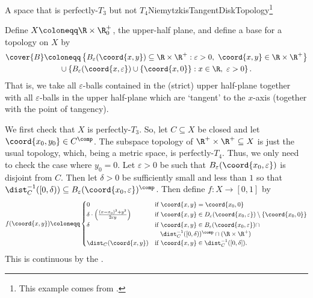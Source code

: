 \begin{exm}{A space that is perfectly-$T_3$ but not $T_4$}{NiemytzkisTangentDiskTopology}\footnote{This example comes from \cite[pg.~100]{Steen}.}
\forwardref

\noindent
Define $X\coloneqq \R \times \R _0^+$, the upper-half plane, and define a base for a topology on $X$ by
\begin{equation*}
\begin{split}
\cover{B} & \coloneqq \left\{ B_\varepsilon (\coord{x,y})\subseteq \R \times \R ^+:\varepsilon >0,\ \coord{x,y}\in \R \times \R ^+\right\} \\
& \qquad \cup \left\{ B_\varepsilon (\coord{x,\varepsilon})\cup \{ \coord{x,0}\} :x\in \R ,\ \varepsilon >0\right\} .
\end{split}
\end{equation*}
That is, we take all $\varepsilon$-balls contained in the (strict) upper half-plane together with all $\varepsilon$-balls in the upper half-plane which are `tangent' to the $x$-axis (together with the point of tangency).

We first check that $X$ is perfectly-$T_3$.  So, let $C\subseteq X$ be closed and let $\coord{x_0,y_0}\in C^{\comp}$.  The subspace topology of $\R ^+\times \R ^+\subseteq X$ is just the usual topology, which, being a metric space, is perfectly-$T_4$.  Thus, we only need to check the case where $y_0=0$.  Let $\varepsilon >0$ be such that $B_{\varepsilon}(\coord{x_0,\varepsilon})$ is disjoint from $C$.  Then let $\delta >0$ be sufficiently small and less than $1$ so that $\dist _C^{-1}([0,\delta ))\subseteq B_{\varepsilon}(\coord{x_0,\varepsilon})^{\comp}$.  Then define $f\colon X\rightarrow [0,1]$ by
{\small
\begin{equation*}
f(\coord{x,y})\coloneqq \begin{cases}0 & \text{if }\coord{x,y}=\coord{x_0,0} \\
\delta \cdot \left( \frac{(x-x_0)^2+y^2}{2\varepsilon y} \right) & \text{if }\coord{x,y}\in D_{\varepsilon}(\coord{x_0,\varepsilon})\setminus \{ \coord{x_0,0}\} \\
\delta & \text{if }\coord{x,y}\in B_{\varepsilon}(\coord{x_0,\varepsilon})\cap \\  & \ \enspace \dist _C^{-1}([0,\delta ))^{\comp}\cap (\R \times \R ^+) \\
\dist _C(\coord{x,y}) & \text{if }\coord{x,y}\in \dist _C^{-1}([0,\delta ]).\end{cases}
\end{equation*}
}
This is continuous by the .


\end{exm}
